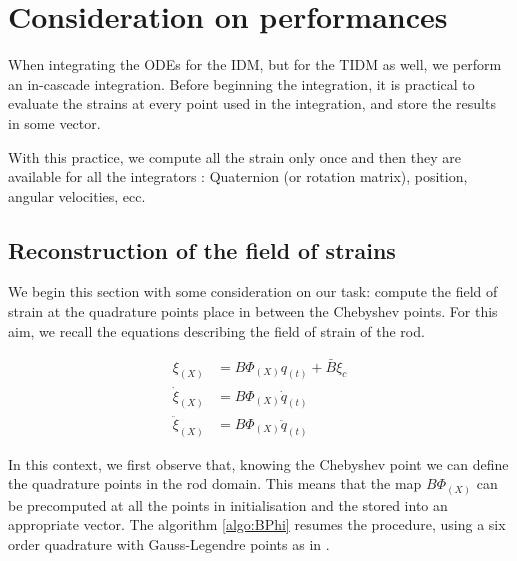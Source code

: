 \documentclass[12pt,a4paper]{article}
\begin{document}
 


\section{Consideration on performances}

When integrating the ODEs for the IDM, but for the TIDM as well, we perform an in-cascade integration. Before beginning the integration, it is practical to evaluate the strains at every point used in the integration, and store the results in some vector. 

With this practice, we compute all the strain only once and then they are available for all the integrators : Quaternion (or rotation matrix), position, angular velocities, ecc.

\subsection{Reconstruction of the field of strains}

We begin this section with some consideration on our task: compute the field of strain at the quadrature points place in between the Chebyshev points. For this aim, we recall the equations describing the field of strain of the rod.

\begin{equation}
\begin{aligned}
	\xi_{(X)} 		&= B \Phi _{(X)} q_{(t)} + \bar{B} \xi_c \\
	\dot{\xi}_{(X)} 	&= B \Phi _{(X)} \dot{q}_{(t)}  \\
	\ddot{\xi}_{(X)}	&= B \Phi _{(X)} \ddot{q}_{(t)} 
\end{aligned}
\end{equation}

In this context, we first observe that, knowing the Chebyshev point we can define the quadrature points in the rod domain. This means that the map $B \Phi _{(X)}$ can be precomputed at all the points in initialisation and the stored into an appropriate vector. The algorithm \ref{algo:BPhi} resumes the procedure, using a six order quadrature with Gauss-Legendre points as in \cite{blanes2009magnus}.
\end{document}
